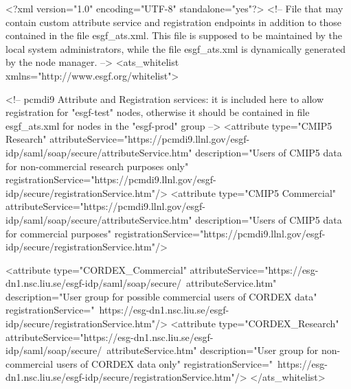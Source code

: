 \begin{tiny}
\begin{verbatimtab}[4]
<?xml version="1.0" encoding="UTF-8" standalone="yes"?>
<!-- File that may contain custom attribute service and registration endpoints 
     in addition to those contained in the file esgf_ats.xml. 
     This file is supposed to be maintained by the local system administrators,
     while the file esgf_ats.xml is dynamically generated by the node manager. -->
<ats_whitelist xmlns="http://www.esgf.org/whitelist">

	<!-- pcmdi9 Attribute and Registration services: it is included here to allow registration for "esgf-test" nodes,
	     otherwise it should be contained in file esgf_ats.xml for nodes in the "esgf-prod" group -->
	<attribute type="CMIP5 Research"
               attributeService="https://pcmdi9.llnl.gov/esgf-idp/saml/soap/secure/attributeService.htm"
               description="Users of CMIP5 data for non-commercial research purposes only"
               registrationService="https://pcmdi9.llnl.gov/esgf-idp/secure/registrationService.htm"/>
    <attribute type="CMIP5 Commercial"
               attributeService="https://pcmdi9.llnl.gov/esgf-idp/saml/soap/secure/attributeService.htm"
               description="Users of CMIP5 data for commercial purposes"
               registrationService="https://pcmdi9.llnl.gov/esgf-idp/secure/registrationService.htm"/>

    <attribute type="CORDEX_Commercial" attributeService="https://esg-dn1.nsc.liu.se/esgf-idp/saml/soap/secure/\
	attributeService.htm" description="User group for possible commercial users of CORDEX data" registrationService="\
	https://esg-dn1.nsc.liu.se/esgf-idp/secure/registrationService.htm"/>
    <attribute type="CORDEX_Research" attributeService="https://esg-dn1.nsc.liu.se/esgf-idp/saml/soap/secure/\
	attributeService.htm" description="User group for non-commercial users of CORDEX data only" registrationService="\
	https://esg-dn1.nsc.liu.se/esgf-idp/secure/registrationService.htm"/>
</ats_whitelist>
\end{verbatimtab}
\end{tiny}

